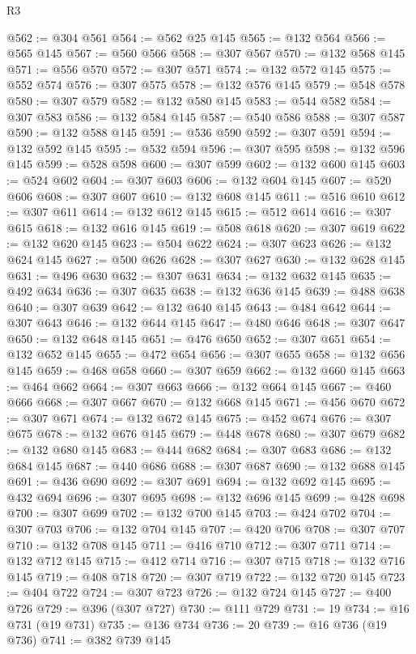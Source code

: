 \begin{lexlean}{R3}
\begin{coremodule}
@562 := @304 @561
@564 := @562 @25 @145
@565 := @132 @564
@566 := @565 @145
@567 := @560 @566
@568 := @307 @567
@570 := @132 @568 @145
@571 := @556 @570
@572 := @307 @571
@574 := @132 @572 @145
@575 := @552 @574
@576 := @307 @575
@578 := @132 @576 @145
@579 := @548 @578
@580 := @307 @579
@582 := @132 @580 @145
@583 := @544 @582
@584 := @307 @583
@586 := @132 @584 @145
@587 := @540 @586
@588 := @307 @587
@590 := @132 @588 @145
@591 := @536 @590
@592 := @307 @591
@594 := @132 @592 @145
@595 := @532 @594
@596 := @307 @595
@598 := @132 @596 @145
@599 := @528 @598
@600 := @307 @599
@602 := @132 @600 @145
@603 := @524 @602
@604 := @307 @603
@606 := @132 @604 @145
@607 := @520 @606
@608 := @307 @607
@610 := @132 @608 @145
@611 := @516 @610
@612 := @307 @611
@614 := @132 @612 @145
@615 := @512 @614
@616 := @307 @615
@618 := @132 @616 @145
@619 := @508 @618
@620 := @307 @619
@622 := @132 @620 @145
@623 := @504 @622
@624 := @307 @623
@626 := @132 @624 @145
@627 := @500 @626
@628 := @307 @627
@630 := @132 @628 @145
@631 := @496 @630
@632 := @307 @631
@634 := @132 @632 @145
@635 := @492 @634
@636 := @307 @635
@638 := @132 @636 @145
@639 := @488 @638
@640 := @307 @639
@642 := @132 @640 @145
@643 := @484 @642
@644 := @307 @643
@646 := @132 @644 @145
@647 := @480 @646
@648 := @307 @647
@650 := @132 @648 @145
@651 := @476 @650
@652 := @307 @651
@654 := @132 @652 @145
@655 := @472 @654
@656 := @307 @655
@658 := @132 @656 @145
@659 := @468 @658
@660 := @307 @659
@662 := @132 @660 @145
@663 := @464 @662
@664 := @307 @663
@666 := @132 @664 @145
@667 := @460 @666
@668 := @307 @667
@670 := @132 @668 @145
@671 := @456 @670
@672 := @307 @671
@674 := @132 @672 @145
@675 := @452 @674
@676 := @307 @675
@678 := @132 @676 @145
@679 := @448 @678
@680 := @307 @679
@682 := @132 @680 @145
@683 := @444 @682
@684 := @307 @683
@686 := @132 @684 @145
@687 := @440 @686
@688 := @307 @687
@690 := @132 @688 @145
@691 := @436 @690
@692 := @307 @691
@694 := @132 @692 @145
@695 := @432 @694
@696 := @307 @695
@698 := @132 @696 @145
@699 := @428 @698
@700 := @307 @699
@702 := @132 @700 @145
@703 := @424 @702
@704 := @307 @703
@706 := @132 @704 @145
@707 := @420 @706
@708 := @307 @707
@710 := @132 @708 @145
@711 := @416 @710
@712 := @307 @711
@714 := @132 @712 @145
@715 := @412 @714
@716 := @307 @715
@718 := @132 @716 @145
@719 := @408 @718
@720 := @307 @719
@722 := @132 @720 @145
@723 := @404 @722
@724 := @307 @723
@726 := @132 @724 @145
@727 := @400 @726
@729 := @396 (@307 @727)
@730 := @111 @729
@731 := 19
@734 := @16 @731 (@19 @731)
@735 := @136 @734
@736 := 20
@739 := @16 @736 (@19 @736)
@741 := @382 @739 @145

\end{coremodule}
\end{lexlean}
